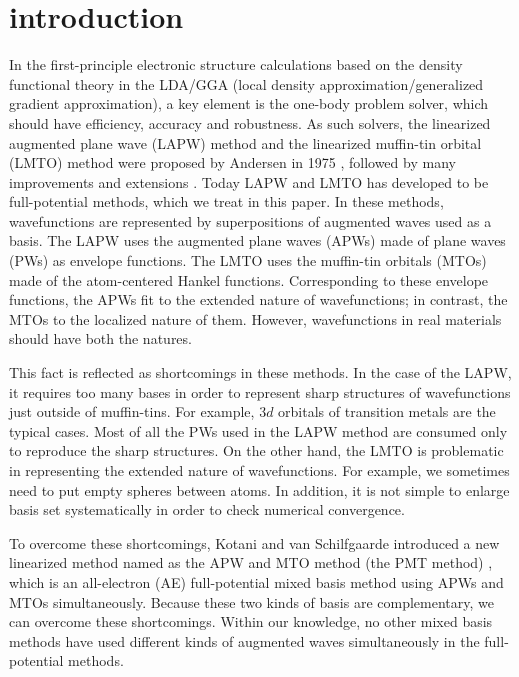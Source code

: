 \documentclass[twocolumn,showpacs,preprintnumbers,amsmath,amssymb,floatfix]{revtex4-1}
\begin{document}
\section{introduction}
In the first-principle electronic structure calculations based on the
density functional theory in the LDA/GGA
(local density approximation/generalized gradient approximation),
a key element is the one-body problem solver, which 
should have efficiency, accuracy and robustness.
As such solvers, the linearized augmented plane wave (LAPW) method and the 
linearized muffin-tin orbital (LMTO) method were proposed by Andersen
in 1975 \cite{Andersen75}, followed by many improvements
and extensions \cite{rmartinbook,Singhbook,bluegel31,lmfchap,PAW,PhysRevB.43.6388}.
Today LAPW and LMTO has developed to be full-potential methods, 
which we treat in this paper.
In these methods, wavefunctions are represented by superpositions of
augmented waves used as a basis. The LAPW uses the augmented plane waves (APWs) made 
of plane waves (PWs) as envelope functions. 
The LMTO uses the muffin-tin orbitals (MTOs) made of the atom-centered 
Hankel functions. Corresponding to these envelope functions, the APWs fit to
the extended nature of wavefunctions; 
in contrast, the MTOs to the localized nature of them.
However, wavefunctions in real materials should have both the natures.

This fact is reflected as shortcomings in these methods.
In the case of the LAPW, it requires too many bases 
in order to represent sharp structures of wavefunctions 
just outside of muffin-tins. For example, 3$d$ orbitals of transition
metals are the typical cases. Most of all the PWs used in the LAPW method 
are consumed only to reproduce the sharp structures.
On the other hand, the LMTO is problematic in representing 
the extended nature of wavefunctions. For example, we sometimes need to 
put empty spheres between atoms. In addition, it is not 
simple to enlarge basis set systematically 
in order to check numerical convergence.

To overcome these shortcomings, 
Kotani and van Schilfgaarde introduced a new linearized method 
named as the APW and MTO method (the PMT method) \cite{pmt1}, which is an all-electron (AE) 
full-potential mixed basis method using APWs and MTOs simultaneously.
Because these two kinds of basis are complementary, 
we can overcome these shortcomings. Within our knowledge, 
no other mixed basis methods have used different kinds 
of augmented waves simultaneously in the full-potential methods.
\end{document}
